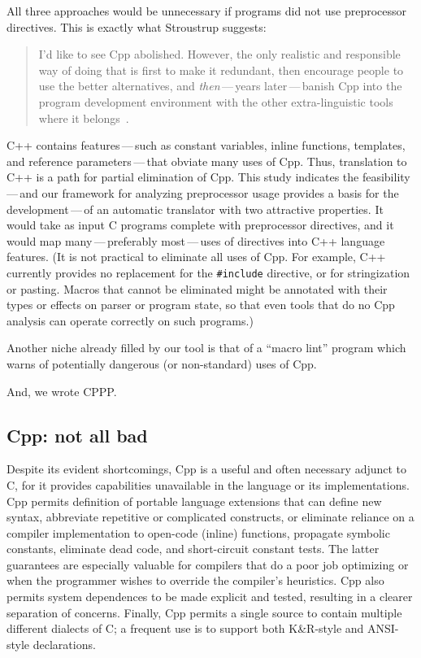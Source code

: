 \documentclass[11pt]{article}
\begin{document}
All three approaches would be unnecessary if programs did not use
preprocessor directives.  This is exactly what Stroustrup suggests:
\begin{quote}
  I'd like to see Cpp abolished.  However, the only realistic and
  responsible way of doing that is first to make it redundant, then
  encourage people to use the better alternatives, and {\em then\/}\,---\,years
  later\,---\,banish Cpp into the program development environment with the
  other extra-linguistic tools where it
  belongs~\cite[p.~426]{Stroustrup-DesignEvolution}.
\end{quote}
C++ contains features\,---\,such as constant variables, inline functions,
templates, and reference parameters\,---\,that obviate many uses of Cpp.
Thus, translation to C++ is a path for partial elimination of Cpp.
This study indicates the
feasibility\,---\,and our framework for analyzing preprocessor usage
provides a basis for the development\,---\,of an automatic translator with
two attractive properties.  It would take as input C programs complete with
preprocessor directives, and it would map many\,---\,preferably
most\,---\,uses of directives into C++ language features.  (It is not
practical to eliminate all uses of Cpp.  For example, C++ currently
provides no replacement for the {\tt \#include} directive, or for
stringization or pasting.  Macros that cannot be eliminated might be
annotated with their types or 
effects on parser or program state, so that even tools that do no Cpp
analysis can operate correctly on such programs.)

Another niche already filled by our tool is that of a ``macro lint''
program which warns of potentially dangerous (or non-standard) uses of Cpp.

And, we wrote CPPP.



\subsection{Cpp: not all bad}

Despite its evident shortcomings, Cpp is a useful and often necessary
adjunct to C, for it provides capabilities unavailable in the language or
its implementations.  Cpp permits definition of portable language
extensions that can define new syntax, abbreviate repetitive or complicated
constructs, or eliminate reliance on a compiler implementation to
open-code (inline) functions, propagate symbolic constants, eliminate dead
code, and short-circuit constant tests.  The latter guarantees are
especially valuable for compilers that do a poor job optimizing or when the
programmer wishes to override the compiler's heuristics.  Cpp also permits
system dependences to be made explicit and tested, resulting in a clearer
separation of concerns.  Finally, Cpp permits a single source to contain
multiple different dialects of C; a frequent use is to support both
K\&R-style and ANSI-style declarations.
\end{document}
